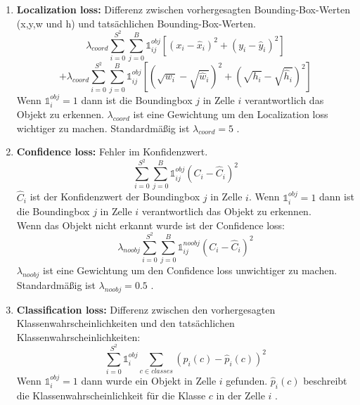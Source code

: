 \documentclass[conference]{IEEEtran}
\begin{document}
	\begin{enumerate}
		\item \textbf{Localization loss:} Differenz zwischen vorhergesagten Bounding-Box-Werten (x,y,w und h) und tatsächlichen Bounding-Box-Werten.
		\[ \lambda_{coord} \sum_{i=0}^{S^2}\sum_{j=0}^{B} \mathbb{1}_{i j}^{obj} [(x_i - \hat{x}_i )^2 + (y_i - \hat{y}_i )^2] \]
		\[ + \lambda_{coord} \sum_{i=0}^{S^2}\sum_{j=0}^{B} \mathbb{1}_{i j}^{obj} [(\sqrt{w_i} - \sqrt{\hat{w}_i} )^2 + (\sqrt{h_i} - \sqrt{\hat{h}_i} )^2] \]
		Wenn $\mathbb{1}_{i}^{obj} = 1$ dann ist die Boundingbox $j$ in Zelle $i$ verantwortlich das Objekt zu erkennen. $\lambda_{coord}$ ist eine Gewichtung um den Localization loss wichtiger zu machen. Standardmäßig ist $\lambda_{coord} = 5$ \cite{b5}.
		
		\item \textbf{Confidence loss:} Fehler im Konfidenzwert.
		\[  \sum_{i=0}^{S^2}\sum_{j=0}^{B} \mathbb{1}_{i j}^{obj} (C_i - \hat{C}_i)^2 \]
		$\hat{C}_i$ ist der Konfidenzwert der Boundingbox $j$ in Zelle $i$. Wenn $\mathbb{1}_{i}^{obj} = 1$ dann ist die Boundingbox $j$ in Zelle $i$ verantwortlich das Objekt zu erkennen.\\
		Wenn das Objekt nicht erkannt wurde ist der Confidence loss:
		\[  \lambda_{noobj} \sum_{i=0}^{S^2}\sum_{j=0}^{B} \mathbb{1}_{i j}^{noobj} (C_i - \hat{C}_i)^2 \]
		$\lambda_{noobj}$ ist eine Gewichtung um den Confidence loss unwichtiger zu machen. Standardmäßig ist $\lambda_{noobj} = 0.5$ \cite{b5}.
		
		\item \textbf{Classification loss:} Differenz zwischen den vorhergesagten Klassenwahrscheinlichkeiten und den tatsächlichen Klassenwahrscheinlichkeiten:
		\[ \sum_{i=0}^{S^2} \mathbb{1}_{i}^{obj} \sum_{c \in classes} (p_i(c) - \hat{p}_i(c))^2 \]
		Wenn $\mathbb{1}_{i}^{obj} = 1$ dann wurde ein Objekt in Zelle $i$ gefunden.
		$\hat{p}_i(c)$ beschreibt die Klassenwahrscheinlichkeit für die Klasse $c$ in der Zelle $i$ \cite{b5}.
	\end{enumerate}
	
\end{document}
